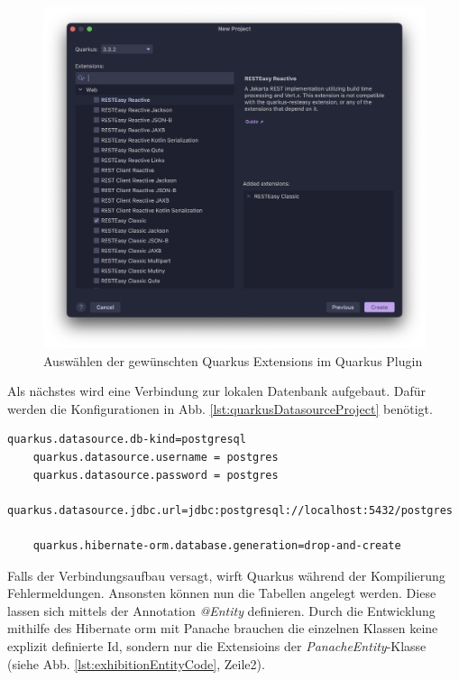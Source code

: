 \begin{figure}
    \centering
    \includegraphics[scale=0.4]{pics/quarkusplugin.png}
    \caption{Auswählen der gewünschten Quarkus Extensions im Quarkus Plugin}
    \label{fig:intellij:plugin}
\end{figure}

Als nächstes wird eine Verbindung zur lokalen Datenbank aufgebaut. 
Dafür werden die Konfigurationen in Abb. \ref{lst:quarkusDatasourceProject} benötigt.

\begin{lstlisting}[label=lst:quarkusDatasourceProject]
    quarkus.datasource.db-kind=postgresql
    quarkus.datasource.username = postgres
    quarkus.datasource.password = postgres
    quarkus.datasource.jdbc.url=jdbc:postgresql://localhost:5432/postgres

    quarkus.hibernate-orm.database.generation=drop-and-create
\end{lstlisting}

Falls der Verbindungsaufbau versagt, wirft Quarkus während der Kompilierung Fehlermeldungen. 
Ansonsten können nun die Tabellen angelegt werden. 
Diese lassen sich mittels der Annotation \emph{@Entity} definieren. 
Durch die Entwicklung mithilfe des Hibernate \gls{orm} mit Panache brauchen die einzelnen Klassen keine explizit definierte Id, sondern nur die Extensioins der \emph{PanacheEntity}-Klasse (siehe Abb. \ref{lst:exhibitionEntityCode}, Zeile2). 

